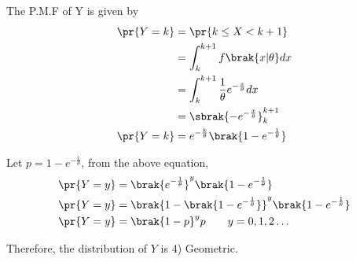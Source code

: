 \documentclass[journal,12pt,twocolumn]{IEEEtran}
\begin{document}
The P.M.F of Y is given by
\begin{align}
    \pr{Y=k} &= \pr{k\leq X < k+1}\\
    &= \int_k^{k+1}f\brak{x|\theta}dx\\
    &= \int_k^{k+1}\frac{1}{\theta}e^{-\frac{x}{\theta}}dx\\
    &= \sbrak{-e^{-\frac{x}{\theta}}}_k^{k+1}\\
    \pr{Y=k} &= e^{-\frac{k}{\theta}}\brak{1-e^{-\frac{1}{\theta}}}
\end{align}

Let $p=1-e^{-\frac{1}{\theta}}$, from the above equation,
\begin{align}
    \pr{Y=y} &= \brak{e^{-\frac{1}{\theta}}}^y \brak{1-e^{-\frac{1}{\theta}}}\\
    \pr{Y=y} &= \brak{1-\brak{1-e^{-\frac{1}{\theta}}}}^y \brak{1-e^{-\frac{1}{\theta}}}\\
    \pr{Y=y} &= \brak{1-p}^y p \qquad y=0,1,2\ldots
\end{align}

Therefore, the distribution of $Y$ is 4) Geometric.
\end{document}
